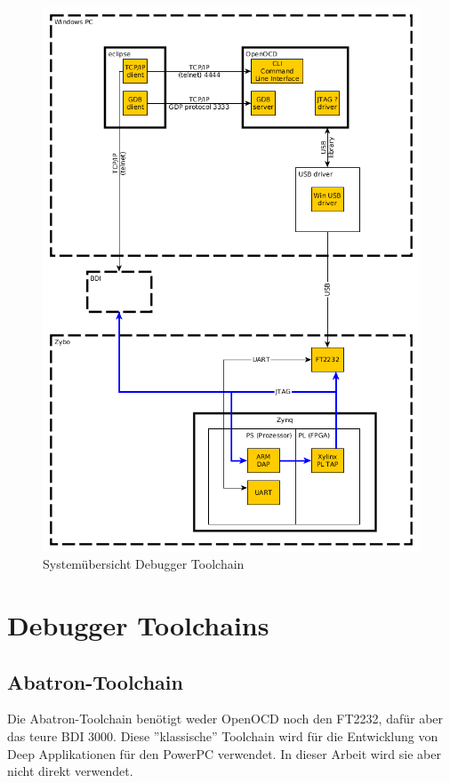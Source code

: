 \begin{figure}[htbp]
	\centering
		\includegraphics[width=\textwidth,height=\textheight,keepaspectratio]{graphs/embeddedDebuggerToolchain.png}
	\caption{Systemübersicht Debugger Toolchain}
	\label{fig:UebersichtDebuggerToolchain}
\end{figure}


\section{Debugger Toolchains}
\subsection{Abatron-Toolchain}
Die Abatron-Toolchain benötigt weder OpenOCD noch den FT2232, dafür aber das teure BDI 3000.
Diese ''klassische'' Toolchain wird für die Entwicklung von Deep Applikationen für den PowerPC verwendet.
In dieser Arbeit wird sie aber nicht direkt verwendet.


